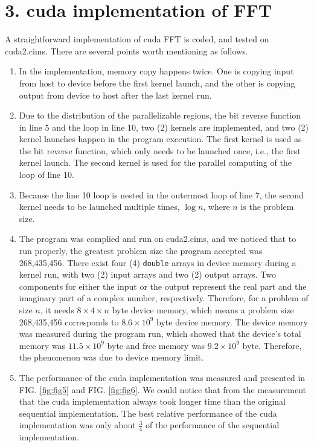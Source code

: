 \documentclass[amsmath,amssymb]{revtex4}
\begin{document}
\section{\label{sec:sec3}3. cuda implementation of FFT}
A straightforward implementation of cuda FFT is coded, and tested on cuda2.cims. There are several points worth mentioning as follows.
\begin{enumerate}
\item In the implementation, memory copy happens twice. One is copying input from host to device before the first kernel launch, and the other is copying output from device to host after the last kernel run.
\item Due to the distribution of the parallelizable regions, the bit reverse function in line 5 and the loop in line 10, two (2) kernels are implemented, and two (2) kernel launches happen in the program execution. The first kernel is used as the bit reverse function, which only needs to be launched once, i.e., the first kernel launch. The second kernel is used for the parallel computing of the loop of line 10.
\item Because the line 10 loop is nested in the outermost loop of line 7, the second kernel needs to be launched multiple times, $\log n$, where $n$ is the problem size. 
\item The program was complied and run on cuda2.cims, and we noticed that to run properly, the greatest problem size the program accepted was 268,435,456. There exist four (4) {\tt double} arrays in device memory during a kernel run, with two (2) input arrays and two (2) output arrays. Two components for either the input or the output represent the real part and the imaginary part of a complex number, respectively. Therefore, for a problem of size $n$, it needs $8\times4\times n$ byte device memory, which means a problem size 268,435,456 corresponds to $8.6\times10^9$ byte device memory. The device memory was measured during the program run, which showed that the device's total memory was $11.5\times10^9$ byte and free memory was $9.2\times10^9$ byte. Therefore, the phenomenon was due to device memory limit.
\item The performance of the cuda implementation was measured and presented in FIG. \ref{fig:fig5} and FIG. \ref{fig:fig6}. We could notice that from the measurement that the cuda implementation always took longer time than the original sequential implementation. The best relative performance of the cuda implementation was only about $\frac{3}{4}$ of the performance of the sequential implementation.

\end{enumerate}
\end{document}
